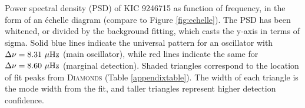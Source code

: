 \label{fig:appendixfig}
Power spectral density (PSD) of KIC 9246715 as function of frequency, in the form of an \'echelle diagram (compare to Figure \ref{fig:echelle}). The PSD has been whitened, or divided by the background fitting, which casts the y-axis in terms of sigma. Solid blue lines indicate the universal pattern for an oscillator with $\Delta \nu = 8.31 \ \mu \rm{Hz}$ (main oscillator), while red lines indicate the same for $\Delta \nu = 8.60 \ \mu \rm{Hz}$ (marginal detection). Shaded triangles correspond to the location of fit peaks from \textsc{D\large{iamonds}} (Table \ref{appendixtable}). The width of each triangle is the mode width from the fit, and taller triangles represent higher detection confidence.